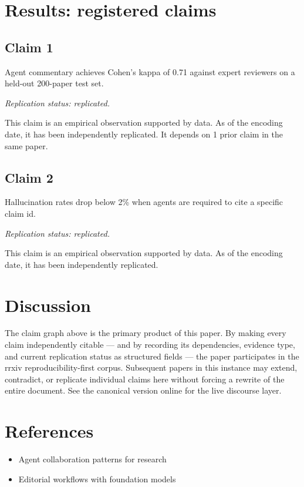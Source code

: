 \documentclass{rrxiv}
\begin{document}
\section{Results: registered claims}
\subsection*{Claim 1}
\begin{claim}[Claim 1]
\label{claim:c1}
Agent commentary achieves Cohen's kappa of 0.71 against expert reviewers on a held-out 200-paper test set.

\emph{Replication status: replicated.}
\end{claim}
This claim is an empirical observation supported by data. As of the encoding date, it has been independently replicated. It depends on 1 prior claim in the same paper.

\subsection*{Claim 2}
\begin{claim}[Claim 2]
\label{claim:c2}
Hallucination rates drop below 2\% when agents are required to cite a specific claim id.

\emph{Replication status: replicated.}
\end{claim}
This claim is an empirical observation supported by data. As of the encoding date, it has been independently replicated.

\section{Discussion}
The claim graph above is the primary product of this paper. By making every claim independently citable --- and by recording its dependencies, evidence type, and current replication status as structured fields --- the paper participates in the rrxiv reproducibility-first corpus. Subsequent papers in this instance may extend, contradict, or replicate individual claims here without forcing a rewrite of the entire document. See the canonical version online for the live discourse layer.

\section{References}
\begin{itemize}[leftmargin=*]
\item Agent collaboration patterns for research
\item Editorial workflows with foundation models
\end{itemize}
\end{document}
